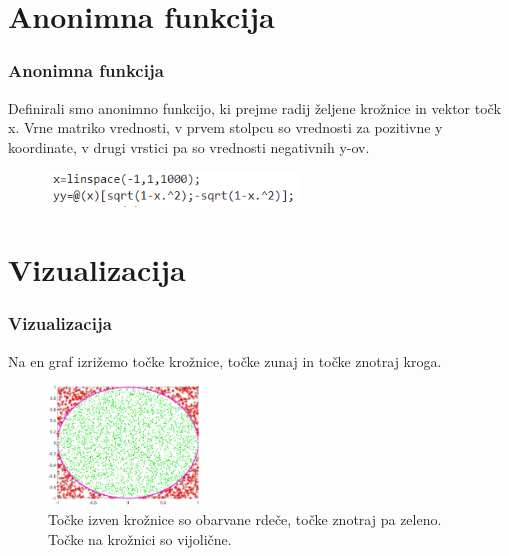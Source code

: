 \documentclass{beamer}
\begin{document}
\section{Anonimna funkcija}

\begin{frame}{}
\frametitle{Anonimna funkcija}
\begin{block}{}
Definirali smo anonimno funkcijo, ki prejme radij željene krožnice in vektor točk x. Vrne matriko vrednosti, v prvem stolpcu so vrednosti za pozitivne y koordinate, v drugi vrstici pa so vrednosti negativnih y-ov.
\begin{figure}
\includegraphics[width=0.6\textwidth]{Anonimna_funkcija.png}
\end{figure}
\end{block}
\end{frame}

\section{Vizualizacija}

\begin{frame}
\frametitle{Vizualizacija}
\begin{block}{}
Na en graf izrižemo točke krožnice, točke zunaj in točke znotraj kroga.
\end{block}
\begin{figure}
\includegraphics[height=120px]{Graf_1.0.jpg}
\caption{Točke izven krožnice so obarvane rdeče, točke znotraj pa zeleno. Točke na krožnici so vijolične.}
\end{figure}
\end{frame}
\end{document}
